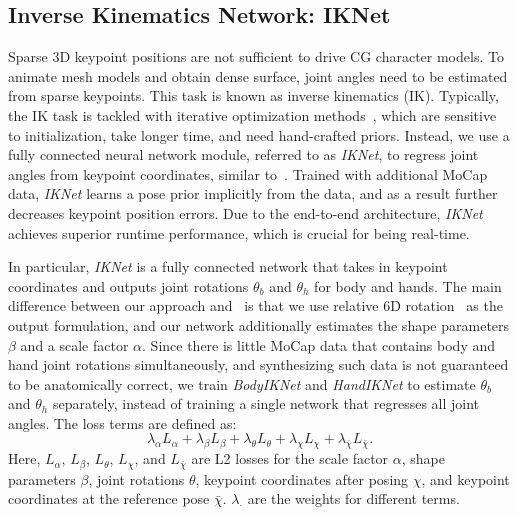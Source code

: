 \documentclass[final]{cvpr}
\begin{document}
 \subsection{Inverse Kinematics Network: IKNet}
\label{sec:IKNet}
Sparse 3D keypoint positions are not sufficient to drive CG character models.
To animate mesh models and obtain dense surface, joint angles need to be estimated from sparse keypoints.
This task is known as inverse kinematics (IK).
Typically, the IK task is tackled with iterative optimization methods~\cite{bogo2016keep,guan2009estimating,xiang2019monocular,xu2018monoperfcap,habermann2019livecap,tkach2016sphere}, which are sensitive to initialization, take longer time, and need hand-crafted priors.
Instead, we use a fully connected neural network module, referred to as \textit{IKNet}, to regress joint angles from keypoint coordinates, similar to~\cite{zhou2020monocular}.
Trained with additional MoCap data, \textit{IKNet} learns a pose prior implicitly from the data, and as a result further decreases keypoint position errors.
Due to the end-to-end architecture, \textit{IKNet} achieves superior runtime performance, which is crucial for being real-time.
\par
In particular, \textit{IKNet} is a fully connected network that takes in keypoint coordinates and outputs joint rotations $\theta_b$ and $\theta_h$ for body and hands.
The main difference between our approach and~\cite{zhou2020monocular} is that we use relative 6D rotation~\cite{zhou2019continuity} as the output formulation, and our network additionally estimates the shape parameters $\beta$ and a scale factor $\alpha$.
Since there is little MoCap data that contains body and hand joint rotations simultaneously, and synthesizing such data is not guaranteed to be anatomically correct, we train \textit{BodyIKNet} and \textit{HandIKNet} to estimate $\theta_b$ and $\theta_h$ separately, instead of training a single network that regresses all joint angles.
The loss terms are defined as:
\begin{equation}
  \lambda_{\alpha} L_{\alpha} + \lambda_{\beta} L_{\beta} + \lambda_{\theta} L_{\theta} + \lambda_{\chi} L_{\chi} + \lambda_{\bar{\chi}} L_{\bar{\chi}} \mathrm{.}
\end{equation}
Here, $L_{\alpha}$, $L_{\beta}$, $L_{\theta}$, $L_{\chi}$, and $L_{\bar{\chi}}$ are L2 losses for the scale factor $\alpha$, shape parameters $\beta$, joint rotations $\theta$, keypoint coordinates after posing $\chi$, and keypoint coordinates at the reference pose $\bar{\chi}$.
$\lambda_{\cdot}$ are the weights for different terms.
\end{document}
